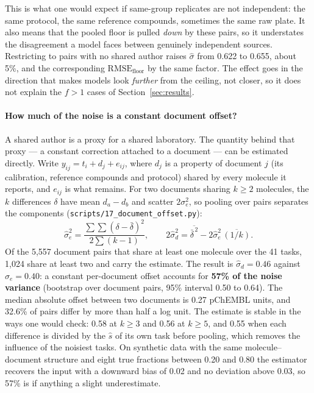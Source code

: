 This is what one would expect if same-group replicates are not independent: the same protocol, the same reference compounds, sometimes the same raw plate. It also means that the pooled floor is pulled \emph{down} by these pairs, so it understates the disagreement a model faces between genuinely independent sources. Restricting to pairs with no shared author raises $\hat\sigma$ from 0.622 to 0.655, about 5\%, and the corresponding $\mathrm{RMSE}_{\mathrm{floor}}$ by the same factor. The effect goes in the direction that makes models look \emph{further} from the ceiling, not closer, so it does not explain the $f>1$ cases of Section~\ref{sec:results}.

\paragraph{How much of the noise is a constant document offset?} A shared author is a proxy for a shared laboratory. The quantity behind that proxy --- a constant correction attached to a document --- can be estimated directly. Write $y_{ij}=t_i+d_j+e_{ij}$, where $d_j$ is a property of document $j$ (its calibration, reference compounds and protocol) shared by every molecule it reports, and $e_{ij}$ is what remains. For two documents sharing $k\ge2$ molecules, the $k$ differences $\delta$ have mean $d_a-d_b$ and scatter $2\sigma_e^2$, so pooling over pairs separates the components (\texttt{scripts/}\allowbreak\texttt{17\_document\_offset.py}):
\begin{equation}
\hat\sigma_e^2=\frac{\sum\sum(\delta-\bar\delta)^2}{2\sum(k-1)},\qquad
2\hat\sigma_d^2=\overline{\bar\delta^{\,2}}-2\hat\sigma_e^2\,\overline{(1/k)} .
\end{equation}
Of the 5{,}557 document pairs that share at least one molecule over the 41 tasks, 1{,}024 share at least two and carry the estimate. The result is $\hat\sigma_d=0.46$ against $\hat\sigma_e=0.40$: a constant per-document offset accounts for \textbf{57\% of the noise variance} (bootstrap over document pairs, 95\% interval 0.50 to 0.64). The median absolute offset between two documents is 0.27 pChEMBL units, and 32.6\% of pairs differ by more than half a log unit. The estimate is stable in the ways one would check: 0.58 at $k\ge3$ and 0.56 at $k\ge5$, and 0.55 when each difference is divided by the $\hat s$ of its own task before pooling, which removes the influence of the noisiest tasks. On synthetic data with the same molecule--document structure and eight true fractions between 0.20 and 0.80 the estimator recovers the input with a downward bias of 0.02 and no deviation above 0.03, so 57\% is if anything a slight underestimate.

